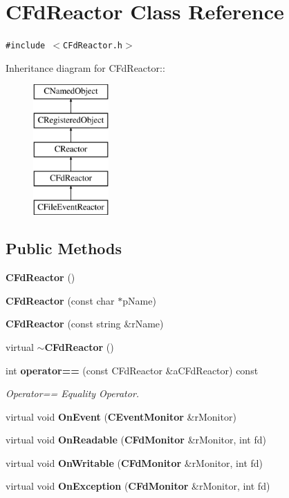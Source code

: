 \section{CFd\-Reactor  Class Reference}
\label{classCFdReactor}
{\tt \#include $<$CFd\-Reactor.h$>$}

Inheritance diagram for CFd\-Reactor::\begin{figure}[H]
\begin{center}
\leavevmode
\includegraphics[height=5cm]{classCFdReactor}
\end{center}
\end{figure}
\subsection*{Public Methods}
\begin{CompactItemize}
\item 
{\bf CFd\-Reactor} ()
\item 
{\bf CFd\-Reactor} (const char $\ast$p\-Name)
\item 
{\bf CFd\-Reactor} (const string \&r\-Name)
\item 
virtual {\bf $\sim$CFd\-Reactor} ()
\item 
int {\bf operator==} (const CFd\-Reactor \&a\-CFd\-Reactor) const
\begin{CompactList}\small\item\em Operator== Equality Operator.\item\end{CompactList}\item 
virtual void {\bf On\-Event} ({\bf CEvent\-Monitor} \&r\-Monitor)
\item 
virtual void {\bf On\-Readable} ({\bf CFd\-Monitor} \&r\-Monitor, int fd)
\item 
virtual void {\bf On\-Writable} ({\bf CFd\-Monitor} \&r\-Monitor, int fd)
\item 
virtual void {\bf On\-Exception} ({\bf CFd\-Monitor} \&r\-Monitor, int fd)
\end{CompactItemize}
